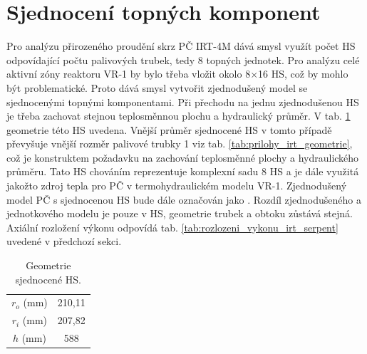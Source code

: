 \section{Sjednocení topných komponent} \label{sec:sjednoceni_topnych_komponent}
Pro analýzu přirozeného proudění skrz PČ IRT-4M dává smysl využít počet HS odpovídající počtu palivových trubek, tedy 8 topných jednotek. Pro analýzu celé aktivní zóny reaktoru VR-1 by bylo třeba vložit okolo 8$\times$16 HS, což by mohlo být problematické. Proto dává smysl vytvořit zjednodušený model se sjednocenými topnými komponentami. Při přechodu na jednu zjednodušenou HS je třeba zachovat stejnou teplosměnnou plochu a hydraulický průměr. V tab. \ref{tab:jednotkovy_model} geometrie této HS uvedena. Vnější průměr sjednocené HS v tomto případě převyšuje vnější rozměr palivové trubky 1 viz tab. \ref{tab:prilohy_irt_geometrie}, což je konstruktem požadavku na zachování teplosměnné plochy a hydraulického průměru. Tato HS chováním reprezentuje komplexní sadu 8 HS a je dále využitá jakožto zdroj tepla pro PČ v termohydraulickém modelu VR-1. Zjednodušený model PČ s sjednocenou HS bude dále označován jako . Rozdíl zjednodušeného a jednotkového modelu je pouze v HS, geometrie trubek a obtoku zůstává stejná. Axiální rozložení výkonu odpovídá tab. \ref{tab:rozlozeni_vykonu_irt_serpent} uvedené v předchozí sekci.
\begin{table}[H]
	\centering
	\caption{Geometrie sjednocené HS.}
	\label{tab:jednotkovy_model}
	\begin{tabular}{cc}
		\hline
		$ r_o $ (mm) & 210,11  \\
		$ r_i $ (mm) & 207,82  \\
		$ h $ (mm) 	 & 588 \\
		
		\hline
	\end{tabular}
\end{table}
